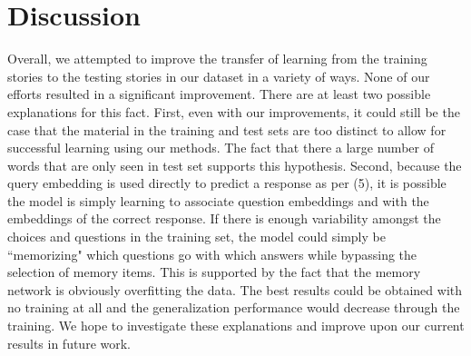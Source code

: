 \documentclass[10pt]{article}
\begin{document}
\section{Discussion}

Overall, we attempted to improve the transfer of learning from the training 
stories to the testing stories in our dataset in a variety of ways. None of our 
efforts resulted in a significant improvement. There are at least two possible 
explanations for this fact.  First, even with our improvements, it could still 
be the case that the material in the training and test sets are too distinct to 
allow for successful learning using our methods. The fact that there a large 
number of words that are only seen in test set supports this hypothesis. Second, 
because the query embedding is used directly to predict a response as per (5), 
it is possible the model is simply learning to associate question embeddings and 
with the embeddings of the correct response. If there is enough variability 
amongst the choices and questions in the training set, the model could simply be 
``memorizing" which questions go with which answers while bypassing the 
selection of memory items. This is supported by the fact that the memory network 
is obviously overfitting the data. The best results could be obtained with no 
training at all and the generalization performance would decrease through the 
training. We hope to investigate these explanations and improve upon our current 
results in future work. 




\end{document}
